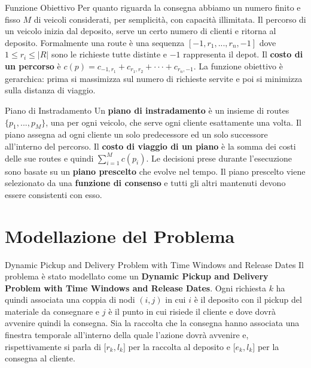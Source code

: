 \documentclass[10pt]{beamer}
\begin{document}
    \begin{frame}{Funzione Obiettivo}  
    Per quanto riguarda la consegna abbiamo un numero finito e fisso {\(M\)} di veicoli considerati, per semplicità, con capacità illimitata. Il percorso di un veicolo inizia dal deposito, serve un certo numero di clienti e ritorna al deposito. Formalmente una route è una sequenza $[-1,r_1,...,r_n,-1]$ dove $1 \leq r_i \leq |R|$ sono le richieste tutte distinte e $-1$ rappresenta il depot. Il \textbf{costo di un percorso} è $c(p) = c_{-1,r_1} + c_{r_1,r_2}+ \cdot \cdot \cdot + c_{r_n,-1}$. \newline La funzione obiettivo è gerarchica: prima si massimizza sul numero di richieste servite e poi si minimizza sulla distanza di viaggio. 
    \end{frame}

    \begin{frame}{Piano di Instradamento}
        Un \textbf{piano di instradamento} è un insieme di routes $\{p_1,...,p_M\}$, una per ogni veicolo, che serve ogni cliente esattamente una volta. Il piano assegna ad ogni cliente un solo predecessore ed un solo successore all'interno del percorso.  Il \textbf{costo di viaggio di un piano} è la somma dei costi delle sue routes e quindi $\sum_{i=1}^M c(p_i)$. Le decisioni prese durante l'esecuzione sono basate su un \textbf{piano prescelto} che evolve nel tempo. Il piano prescelto viene selezionato da una \textbf{funzione di consenso} e tutti gli altri mantenuti devono essere consistenti con esso.
    \end{frame}

    \section{Modellazione del Problema}\label{sec:mod-problema}
    \begin{frame}{Dynamic Pickup and Delivery Problem with Time Windows and Release Dates}  
    Il problema è stato modellato come un \textbf{Dynamic Pickup and Delivery Problem with Time Windows and Release Dates}. Ogni richiesta {\(k\)} ha quindi associata una coppia di nodi {\((i,j)\)} in cui {\(i\)} è il deposito con il pickup del materiale da consegnare e {\(j\)} è il punto in cui risiede il cliente e dove dovrà avvenire quindi la consegna. Sia la raccolta che la consegna hanno associata una finestra temporale all'interno della quale l'azione dovrà avvenire e, rispettivamente si parla di {\(\lbrack r_{k},l_{k}\rbrack\)} per la raccolta al deposito e {\(\lbrack e_{k},l_{k}\rbrack\)} per la consegna al cliente.
    \end{frame}
\end{document}

